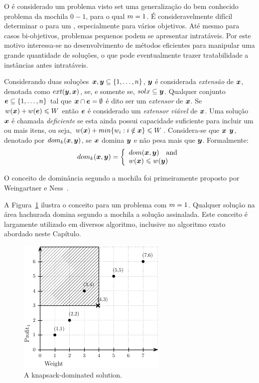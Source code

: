 O \mokp{} é considerado um problema \nphard{} visto set uma generalização
do bem conhecido problema da mochila $0-1$, para o qual $m = 1$.
É consideravelmente difícil determinar o \paretoset para um \mokp{},
especialmente para vários objetivos.
Até mesmo para casos bi-objetivos, problemas pequenos podem se apresentar
intratáveis.
Por este motivo interessa-se no desenvolvimento de métodos eficientes
para manipular uma grande quantidade de soluções, o que pode eventualmente
trazer tratabilidade a instâncias antes intratáveis.

Considerando duas soluções $\boldsymbol{x}, \boldsymbol{y} \subseteq \{1, \ldots, n\}$,
$\boldsymbol{y}$ é considerada \emph{extensão} de $\boldsymbol{x}$, denotada como $ext(\boldsymbol{y}, \boldsymbol{x})$,
se, e somente se, $sol{x} \subseteq \boldsymbol{y}$.
Qualquer conjunto $\boldsymbol{e} \subseteq \{1, \ldots, n\}$ tal que $\boldsymbol{x} \cap \boldsymbol{e} = \emptyset$
é dito ser um \emph{extensor} de $\boldsymbol{x}$.
Se $w(\boldsymbol{x}) + w(\boldsymbol{e}) \leqslant W$ então $\boldsymbol{e}$ é considerado um
\emph{extensor viável} de $\boldsymbol{x}$.
Uma solução $\boldsymbol{x}$ é chamada \emph{deficiente} se esta ainda possui capacidade
suficiente para incluir um ou mais itens, ou seja, $w(\boldsymbol{x}) + min\{ w_i : i \notin \boldsymbol{x} \} \leqslant W$.
Considera-se que $\boldsymbol{x}$ \emph{\knapsackdominates} $\boldsymbol{y}$, denotado por
$dom_k(\boldsymbol{x}, \boldsymbol{y})$, se $\boldsymbol{x}$ domina $\boldsymbol{y}$ e não pesa mais que $\boldsymbol{y}$.
Formalmente:
\begin{equation}
  \label{eq:kdom}
  dom_k(\boldsymbol{x}, \boldsymbol{y}) = \left\{
    \begin{array}{l}
      dom(\boldsymbol{x}, \boldsymbol{y}) \quad \text{and} \\
      w(\boldsymbol{x}) \leqslant w(\boldsymbol{y})
    \end{array}
  \right.
\end{equation}

O conceito de dominância segundo a mochila foi primeiramente proposto por
Weingartner e Ness~\cite{weingartner1967methods}.

A Figura~\ref{fig:kdom} ilustra o conceito para um problema com $m = 1$.
Qualquer solução na área hachurada domina segundo a mochila a solução assinalada.
Este conceito é largamente utilizado em diversos algoritmo, inclusive no
algoritmo exato abordado neste Capítulo.

\begin{figure}
  \centering
  \includegraphics[scale=1.2]{img/kdt/dom}
  \caption{A knapsack-dominated solution.}
  \label{fig:kdom}
\end{figure}

